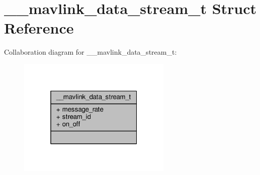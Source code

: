 \hypertarget{struct____mavlink__data__stream__t}{\section{\+\_\+\+\_\+mavlink\+\_\+data\+\_\+stream\+\_\+t Struct Reference}
\label{struct____mavlink__data__stream__t}
}


Collaboration diagram for \+\_\+\+\_\+mavlink\+\_\+data\+\_\+stream\+\_\+t\+:
\nopagebreak
\begin{figure}[H]
\begin{center}
\leavevmode
\includegraphics[width=208pt]{struct____mavlink__data__stream__t__coll__graph}
\end{center}
\end{figure}
